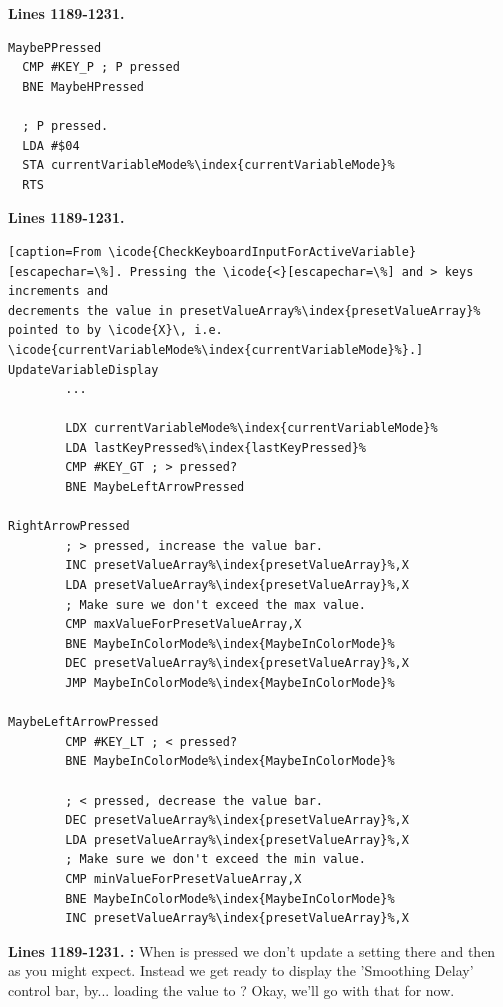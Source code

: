 \clearpage
\textbf{Lines 1189-1231. } 
\begin{lstlisting}[caption=From \icode{CheckKeyboardInput\index{CheckKeyboardInput}}.,escapechar=\%]
MaybePPressed   
  CMP #KEY_P ; P pressed
  BNE MaybeHPressed

  ; P pressed.
  LDA #$04
  STA currentVariableMode%\index{currentVariableMode}%
  RTS 
\end{lstlisting}
\textbf{Lines 1189-1231. } 
\begin{lstlisting}[escapechar=\%][caption=From \icode{CheckKeyboardInputForActiveVariable}[escapechar=\%]. Pressing the \icode{<}[escapechar=\%] and > keys increments and
decrements the value in presetValueArray%\index{presetValueArray}% pointed to by \icode{X}\, i.e. \icode{currentVariableMode%\index{currentVariableMode}%}.]
UpdateVariableDisplay   
        ...

        LDX currentVariableMode%\index{currentVariableMode}%
        LDA lastKeyPressed%\index{lastKeyPressed}%
        CMP #KEY_GT ; > pressed?
        BNE MaybeLeftArrowPressed

RightArrowPressed
        ; > pressed, increase the value bar.
        INC presetValueArray%\index{presetValueArray}%,X
        LDA presetValueArray%\index{presetValueArray}%,X
        ; Make sure we don't exceed the max value.
        CMP maxValueForPresetValueArray,X
        BNE MaybeInColorMode%\index{MaybeInColorMode}%
        DEC presetValueArray%\index{presetValueArray}%,X
        JMP MaybeInColorMode%\index{MaybeInColorMode}%

MaybeLeftArrowPressed   
        CMP #KEY_LT ; < pressed?
        BNE MaybeInColorMode%\index{MaybeInColorMode}%

        ; < pressed, decrease the value bar.
        DEC presetValueArray%\index{presetValueArray}%,X
        LDA presetValueArray%\index{presetValueArray}%,X
        ; Make sure we don't exceed the min value.
        CMP minValueForPresetValueArray,X
        BNE MaybeInColorMode%\index{MaybeInColorMode}%
        INC presetValueArray%\index{presetValueArray}%,X
\end{lstlisting}
\clearpage

\textbf{Lines 1189-1231. :} When  is pressed we don't
update a setting there and then as you might expect. Instead we get ready to display the 'Smoothing
Delay' control bar, by... loading the value  to ? Okay, we'll
go with that for now.

